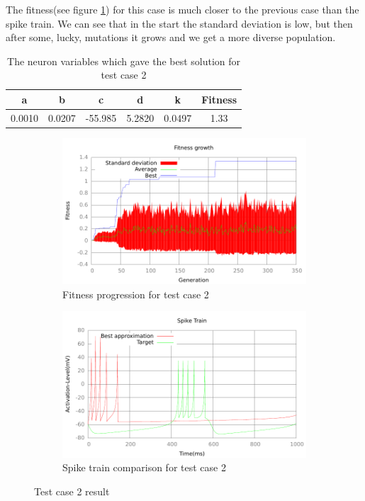 The fitness(see figure \ref{fig:fitness-test-case-2}) for this case is much 
closer to the previous case than the spike
train. We can see that in the start the standard deviation is low, but then
after some, lucky, mutations it grows and we get a more diverse population.
\begin{table}
	\begin{tabular}{c c c c c c}
		a & b & c & d & k & Fitness\\
		\hline
		0.0010 & 0.0207 & -55.985 & 5.2820 & 0.0497 & 1.33
	\end{tabular}
	\caption{The neuron variables which gave the best solution for test case
	2}
\end{table}
\begin{figure}[h]
	\centering
	\begin{subfigure}[b]{0.5\textwidth}
		\includegraphics[width=\textwidth]{../output/sidm_izzy_1_fitness.pdf}
		\caption{Fitness progression for test case 2}
		\label{fig:fitness-test-case-2}
	\end{subfigure}%
	\begin{subfigure}[b]{0.5\textwidth}
		\includegraphics[width=\textwidth]{../output/sidm_izzy_1_spike.pdf}
		\caption{Spike train comparison for test case 2}
		\label{fig:spike-test-case-2}
	\end{subfigure}
	\caption{Test case 2 result}
\end{figure}

